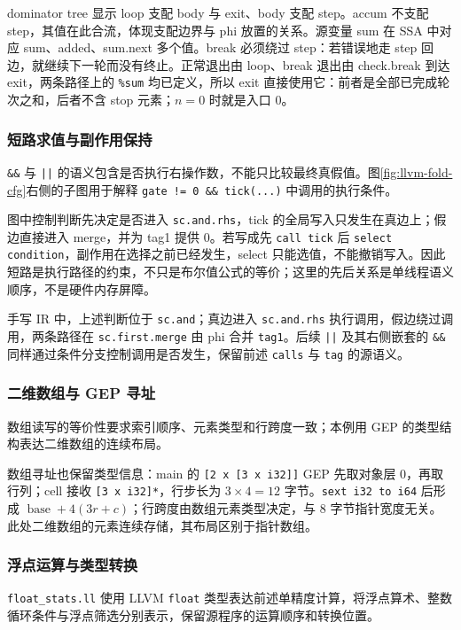 dominator tree 显示 loop 支配 body 与 exit、body 支配 step。accum 不支配 step，其值在此合流，体现支配边界与 phi 放置的关系。源变量 sum 在 SSA 中对应 sum、added、sum.next 多个值。break 必须绕过 step：若错误地走 step 回边，就继续下一轮而没有终止。正常退出由 loop、break 退出由 check.break 到达 exit，两条路径上的 \texttt{\%sum} 均已定义，所以 exit 直接使用它：前者是全部已完成轮次之和，后者不含 stop 元素；$n=0$ 时就是入口 0。

\subsubsection{短路求值与副作用保持}
\label{sec:sysy-ir-short-circuit}
\texttt{\&\&} 与 \texttt{||} 的语义包含是否执行右操作数，不能只比较最终真假值。图\ref{fig:llvm-fold-cfg}右侧的子图用于解释 \texttt{gate != 0 \&\& tick(...)} 中调用的执行条件。

图中控制判断先决定是否进入 \texttt{sc.and.rhs}，tick 的全局写入只发生在真边上；假边直接进入 merge，并为 tag1 提供 0。若写成先 \texttt{call tick} 后 \texttt{select condition}，副作用在选择之前已经发生，select 只能选值，不能撤销写入。因此短路是执行路径的约束，不只是布尔值公式的等价；这里的先后关系是单线程语义顺序，不是硬件内存屏障。

手写 IR 中，上述判断位于 \texttt{sc.and}；真边进入 \texttt{sc.and.rhs} 执行调用，假边绕过调用，两条路径在 \texttt{sc.first.merge} 由 phi 合并 \texttt{tag1}。后续 \texttt{||} 及其右侧嵌套的 \texttt{\&\&} 同样通过条件分支控制调用是否发生，保留前述 \texttt{calls} 与 \texttt{tag} 的源语义。

\subsubsection{二维数组与 GEP 寻址}
\label{sec:sysy-ir-gep}
数组读写的等价性要求索引顺序、元素类型和行跨度一致；本例用 GEP 的类型结构表达二维数组的连续布局。

数组寻址也保留类型信息：main 的 \texttt{[2 x [3 x i32]]} GEP 先取对象层 0，再取行列；cell 接收 \texttt{[3 x i32]*}，行步长为 $3\times4=12$ 字节。\texttt{sext i32 to i64} 后形成 $\operatorname{base}+4(3r+c)$；行跨度由数组元素类型决定，与 8 字节指针宽度无关。此处二维数组的元素连续存储，其布局区别于指针数组。

\subsubsection{浮点运算与类型转换}
\label{sec:sysy-ir-float}
\texttt{float\_stats.ll} 使用 LLVM \texttt{float} 类型表达前述单精度计算，将浮点算术、整数循环条件与浮点筛选分别表示，保留源程序的运算顺序和转换位置。

